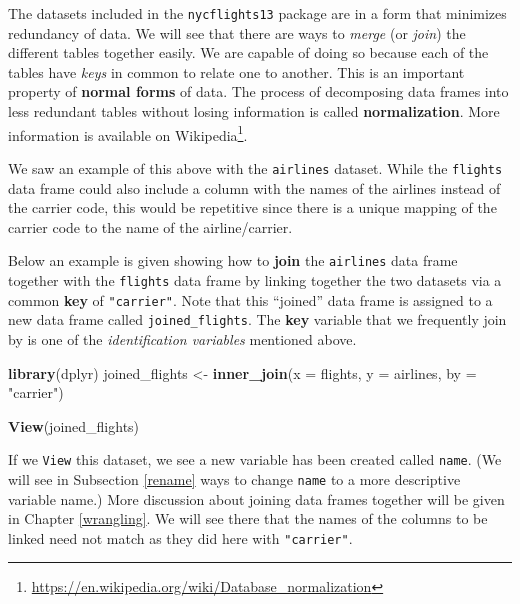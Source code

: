 \documentclass[12pt,]{krantz}
\makeatletter
\newenvironment{Shaded}{\begin{snugshade}}{\end{snugshade}}
\newcommand{\KeywordTok}[1]{\textcolor[rgb]{0.27,0.27,0.27}{\textbf{#1}}}
\newcommand{\DataTypeTok}[1]{\textcolor[rgb]{0.27,0.27,0.27}{#1}}
\newcommand{\StringTok}[1]{\textcolor[rgb]{0.5,0.5,0.5}{#1}}
\newcommand{\NormalTok}[1]{#1}
\renewcommand{\href}[2]{#2\footnote{\url{#1}}}
\newenvironment{kframe}{%
\medskip{}
\setlength{\fboxsep}{.8em}
 \def\at@end@of@kframe{}%
 \ifinner\ifhmode%
  \def\at@end@of@kframe{\end{minipage}}%
  \begin{minipage}{\columnwidth}%
 \fi\fi%
 \def\FrameCommand##1{\hskip\@totalleftmargin \hskip-\fboxsep
 \colorbox{shadecolor}{##1}\hskip-\fboxsep
     \hskip-\linewidth \hskip-\@totalleftmargin \hskip\columnwidth}%
 \MakeFramed {\advance\hsize-\width
   \@totalleftmargin\z@ \linewidth\hsize
   \@setminipage}}%
 {\par\unskip\endMakeFramed%
 \at@end@of@kframe}
\renewenvironment{Shaded}{\begin{kframe}}{\end{kframe}}
\theoremstyle{definition}
\theoremstyle{definition}
\theoremstyle{definition}
\theoremstyle{remark}
\makeatother
\begin{document}
The datasets included in the \texttt{nycflights13} package are in a form
that minimizes redundancy of data. We will see that there are ways to
\emph{merge} (or \emph{join}) the different tables together easily. We
are capable of doing so because each of the tables have \emph{keys} in
common to relate one to another. This is an important property of
\textbf{normal forms} of data. The process of decomposing data frames
into less redundant tables without losing information is called
\textbf{normalization}. More information is available on
\href{https://en.wikipedia.org/wiki/Database_normalization}{Wikipedia}.

We saw an example of this above with the \texttt{airlines} dataset.
While the \texttt{flights} data frame could also include a column with
the names of the airlines instead of the carrier code, this would be
repetitive since there is a unique mapping of the carrier code to the
name of the airline/carrier.

Below an example is given showing how to \textbf{join} the
\texttt{airlines} data frame together with the \texttt{flights} data
frame by linking together the two datasets via a common \textbf{key} of
\texttt{"carrier"}. Note that this ``joined'' data frame is assigned to
a new data frame called \texttt{joined\_flights}. The \textbf{key}
variable that we frequently join by is one of the \emph{identification
variables} mentioned above.

\begin{Shaded}
\begin{Highlighting}[]
\KeywordTok{library}\NormalTok{(dplyr)}
\NormalTok{joined_flights <-}\StringTok{ }\KeywordTok{inner_join}\NormalTok{(}\DataTypeTok{x =}\NormalTok{ flights, }
                             \DataTypeTok{y =}\NormalTok{ airlines, }
                             \DataTypeTok{by =} \StringTok{"carrier"}\NormalTok{)}
\end{Highlighting}
\end{Shaded}

\begin{Shaded}
\begin{Highlighting}[]
\KeywordTok{View}\NormalTok{(joined_flights)}
\end{Highlighting}
\end{Shaded}

If we \texttt{View} this dataset, we see a new variable has been created
called \texttt{name}. (We will see in Subsection \ref{rename} ways to
change \texttt{name} to a more descriptive variable name.) More
discussion about joining data frames together will be given in Chapter
\ref{wrangling}. We will see there that the names of the columns to be
linked need not match as they did here with \texttt{"carrier"}.
\end{document}
